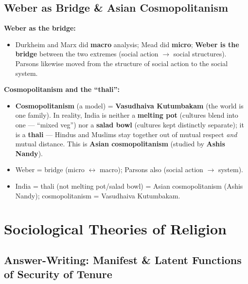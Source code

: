 \sectiondivider

\subsection{Weber as Bridge \& Asian Cosmopolitanism}

\begin{KeyConcept}
\textbf{Weber as the bridge:}
\begin{itemize}
\item Durkheim and Marx did \textbf{macro} analysis; Mead did \textbf{micro}; \textbf{Weber is the bridge} between the two extremes (social action $\rightarrow$ social structures). Parsons likewise moved from the structure of social action to the social system.
\end{itemize}
\end{KeyConcept}

\begin{KeyConcept}
\textbf{Cosmopolitanism and the ``thali'':}
\begin{itemize}
\item \textbf{Cosmopolitanism} (a model) = \textbf{Vasudhaiva Kutumbakam} (the world is one family). In reality, India is neither a \textbf{melting pot} (cultures blend into one --- ``mixed veg'') nor a \textbf{salad bowl} (cultures kept distinctly separate); it is a \textbf{thali} --- Hindus and Muslims stay together out of mutual respect \textit{and} mutual distance. This is \textbf{Asian cosmopolitanism} (studied by \textbf{Ashis Nandy}).
\end{itemize}
\end{KeyConcept}

\begin{QuickRevision}
\begin{itemize}
\item Weber = bridge (micro $\leftrightarrow$ macro); Parsons also (social action $\rightarrow$ system).
\item India = thali (not melting pot/salad bowl) = Asian cosmopolitanism (Ashis Nandy); cosmopolitanism = Vasudhaiva Kutumbakam.
\end{itemize}
\end{QuickRevision}

\sectiondivider

\section{Sociological Theories of Religion}

\subsection{Answer-Writing: Manifest \& Latent Functions of Security of Tenure}

